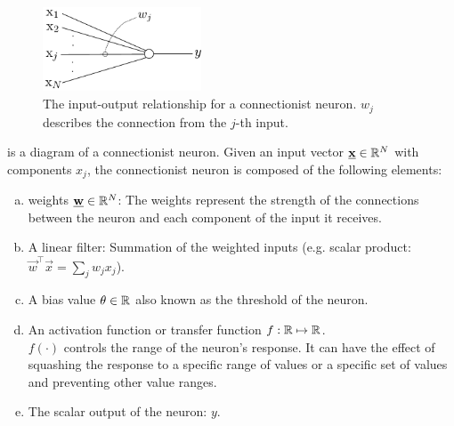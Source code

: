 \begin{frame}
    
    \begin{figure}[h]
        \centering
        \includegraphics[height=2.5cm]{img/linearNeuron_y.pdf}
        \caption{The input-output relationship for a connectionist neuron. $w_{j}$ describes the connection from the $j$-th input.}
        \label{fig:neuron_diagram}
    \end{figure}
    
     is a diagram of a connectionist neuron. Given an input vector $\underline{\mathbf{x}} \in \mathbb{R}^{N}$ with components $x_{j}$,
    the connectionist neuron is composed of the following elements:

    \begin{enumerate}[(a)]
        \item weights $\underline{\mathbf{w}} \in \mathbb{R}^{N}$: The weights represent the strength of the connections between the neuron and each component of the input it receives.\\
        
        \item A linear filter: Summation of the weighted inputs (e.g. scalar product: $\vec w^{\top} \vec x = \sum_{j} w_{j} x_{j}$).
        
        \item A bias value $\theta \in \mathbb{R}$ also known as the threshold of the neuron.\\
        

        
        \item An activation function or transfer function $f: \mathbb{R} \mapsto \mathbb{R}$. \\
        
        $f(\cdot)$ controls the range of the neuron's response. It can have the effect of squashing the response to a specific range of values or a specific set of values and preventing other value ranges.
        \item The scalar output of the neuron: $y$.
    \end{enumerate}
    

\end{frame}
